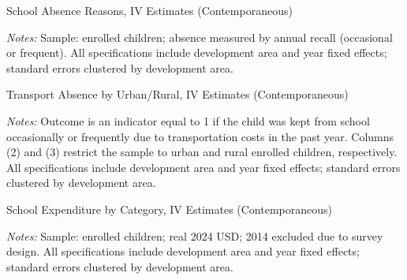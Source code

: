\documentclass[12pt]{article}
\newcommand*{\TableContempPath}{../Paper_3_Tables/Main_Regression_Tables}
\begin{document}
	\begin{table}[H]
	\centering
	\begin{adjustbox}{max width=\linewidth, center}
	\begin{threeparttable}
		\caption{School Absence Reasons, IV Estimates (Contemporaneous)}
		\label{tab:absence_reasons_contemp}
		{\small}
		\begin{tablenotes}
			\small
			\item \textit{Notes:} Sample: enrolled children; absence measured by annual recall (occasional or frequent). All specifications include development area and year fixed effects; standard errors clustered by development area.
		\end{tablenotes}
	\end{threeparttable}
	\end{adjustbox}
	\end{table}
	\begin{table}[H]
	\centering
	\begin{adjustbox}{max width=\linewidth, center}
	\begin{threeparttable}
		\caption{Transport Absence by Urban/Rural, IV Estimates (Contemporaneous)}
		\label{tab:rural_attendance_contemp}
		{\small}
		\begin{tablenotes}
			\small
			\item \textit{Notes:} Outcome is an indicator equal to 1 if the child was kept from school occasionally or frequently due to transportation costs in the past year. Columns (2) and (3) restrict the sample to urban and rural enrolled children, respectively. All specifications include development area and year fixed effects; standard errors clustered by development area.
		\end{tablenotes}
	\end{threeparttable}
	\end{adjustbox}
	\end{table}
	\begin{table}[H]
	\centering
	\begin{adjustbox}{max width=\linewidth, center}
	\begin{threeparttable}
		\caption{School Expenditure by Category, IV Estimates (Contemporaneous)}
		\label{tab:expenditures_level_contemp}
		{\small}
		\begin{tablenotes}
			\small
			\item \textit{Notes:} Sample: enrolled children; real 2024 USD; 2014 excluded due to survey design. All specifications include development area and year fixed effects; standard errors clustered by development area.
		\end{tablenotes}
	\end{threeparttable}
	\end{adjustbox}
	\end{table}
\end{document}
